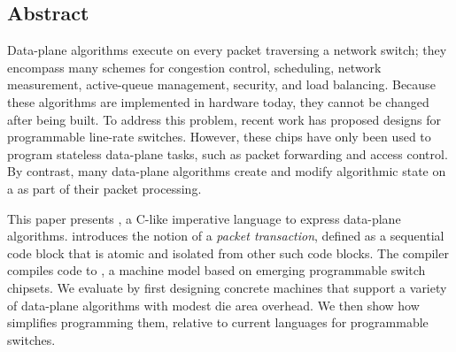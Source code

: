 \subsection*{Abstract}
Data-plane algorithms execute on every packet traversing a network switch; they
encompass many schemes for congestion control, scheduling, network measurement,
active-queue management, security, and load balancing. Because these algorithms
are implemented in hardware today, they cannot be changed after being built. To
address this problem, recent work has proposed designs for programmable
line-rate switches.  However, these chips have only been used to program
stateless data-plane tasks, such as packet forwarding and access control. By
contrast, many data-plane algorithms create and modify algorithmic state on a
as part of their packet processing.

This paper presents \pktlanguage, a C-like imperative language to express
data-plane algorithms. \pktlanguage introduces the notion of a {\em packet
transaction}, defined as a sequential code block that is atomic and isolated
from other such code blocks.  The \pktlanguage compiler compiles \pktlanguage
code to \absmachine, a machine model based on emerging programmable switch
chipsets. We evaluate \pktlanguage by first designing concrete \absmachine
machines that support a variety of data-plane algorithms with modest die area
overhead. We then show how \pktlanguage simplifies programming them, relative
to current languages for programmable switches.
